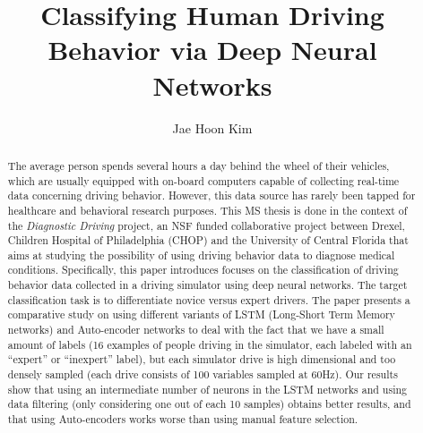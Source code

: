\documentclass[draft,dvipsnames]{drexel-thesis}
\author{Jae Hoon Kim}
\title{Classifying Human Driving Behavior via Deep Neural Networks}
\begin{document}
\begin{preamble}



\tableofcontents
\listoftables
\listoffigures


\begin{abstract}
The average person spends several hours a day behind the wheel of their vehicles, which are usually equipped with on-board computers capable of collecting real-time data concerning driving behavior. However, this data source has rarely been tapped for healthcare and behavioral research purposes. This MS thesis is done in the context of the {\em Diagnostic Driving} project, an NSF funded collaborative project between Drexel, Children Hospital of Philadelphia (CHOP) and the University of Central Florida that aims at studying the possibility of using driving behavior data to diagnose medical conditions.
%
Specifically, this paper introduces focuses on the classification of driving behavior data collected in a driving simulator using deep neural networks. The target classification task is to differentiate novice versus expert drivers. The paper presents a comparative study on using different variants of LSTM (Long-Short Term Memory networks) and Auto-encoder networks to deal with the fact that we have a small amount of labels (16 examples of people driving in the simulator, each labeled with an ``expert'' or ``inexpert'' label), but each simulator drive is high dimensional and too densely sampled (each drive consists of 100 variables sampled at 60Hz).
%
Our results show that using an intermediate number of neurons in the LSTM networks and using data filtering (only considering one out of each 10 samples) obtains better results, and that using Auto-encoders works worse than using manual feature selection.
\end{abstract}
\end{preamble}
\end{document}
